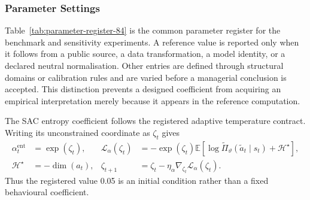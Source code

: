 \documentclass[a4paper,fleqn]{cas-sc}
\newcommand{\E}{\mathbb{E}}
\begin{document}
\subsubsection{Parameter Settings}

Table~\ref{tab:parameter-register-84} is the common parameter register for
the benchmark and sensitivity experiments. A reference value is reported only when it follows from a
public source, a data transformation, a model identity, or a declared neutral
normalisation. Other entries are defined through structural domains or
calibration rules and are varied before a managerial conclusion is accepted.
This distinction prevents a designed coefficient from acquiring an empirical
interpretation merely because it appears in the reference computation.

The SAC entropy coefficient follows the registered adaptive temperature
contract. Writing its unconstrained coordinate as $\zeta_t$ gives
\begin{equation}
 \begin{aligned}
 \alpha^{\mathrm{ent}}_t&=\exp(\zeta_t),
 &\mathcal L_{\alpha}(\zeta_t)
 &=-\exp(\zeta_t)\E\!\left[
 \log\widetilde\Pi_\vartheta(\widetilde a_t\mid s_t)
 +\mathcal H^\star\right],\\
 \mathcal H^\star&=-\dim(a_t),
 &\zeta_{t+1}&=\zeta_t-
 \eta_{\alpha}\nabla_{\zeta_t}\mathcal L_{\alpha}(\zeta_t).
 \end{aligned}
 \label{eq:sac-temperature-update-51}
\end{equation}
Thus the registered value 0.05 is an initial condition rather than a fixed
behavioural coefficient.
\end{document}
